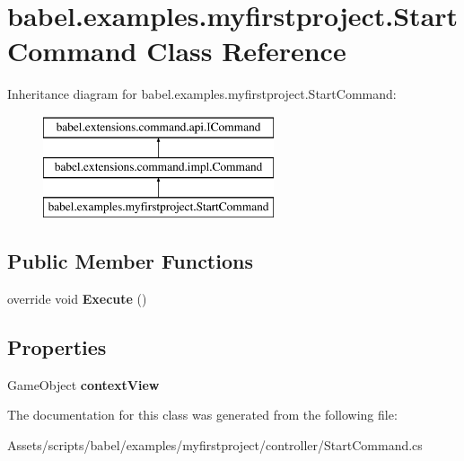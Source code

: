 \hypertarget{classbabel_1_1examples_1_1myfirstproject_1_1_start_command}{\section{babel.\-examples.\-myfirstproject.\-Start\-Command Class Reference}
\label{classbabel_1_1examples_1_1myfirstproject_1_1_start_command}
}
Inheritance diagram for babel.\-examples.\-myfirstproject.\-Start\-Command\-:\begin{figure}[H]
\begin{center}
\leavevmode
\includegraphics[height=3.000000cm]{classbabel_1_1examples_1_1myfirstproject_1_1_start_command}
\end{center}
\end{figure}
\subsection*{Public Member Functions}
\begin{DoxyCompactItemize}
\item 
\hypertarget{classbabel_1_1examples_1_1myfirstproject_1_1_start_command_ace6ddd4e30b2732594853e57b02481ec}{override void {\bfseries Execute} ()}\label{classbabel_1_1examples_1_1myfirstproject_1_1_start_command_ace6ddd4e30b2732594853e57b02481ec}

\end{DoxyCompactItemize}
\subsection*{Properties}
\begin{DoxyCompactItemize}
\item 
\hypertarget{classbabel_1_1examples_1_1myfirstproject_1_1_start_command_a1a84171e7037c1d39768fb6bad6a9ebe}{Game\-Object {\bfseries context\-View}}\label{classbabel_1_1examples_1_1myfirstproject_1_1_start_command_a1a84171e7037c1d39768fb6bad6a9ebe}

\end{DoxyCompactItemize}


The documentation for this class was generated from the following file\-:\begin{DoxyCompactItemize}
\item 
Assets/scripts/babel/examples/myfirstproject/controller/Start\-Command.\-cs\end{DoxyCompactItemize}

